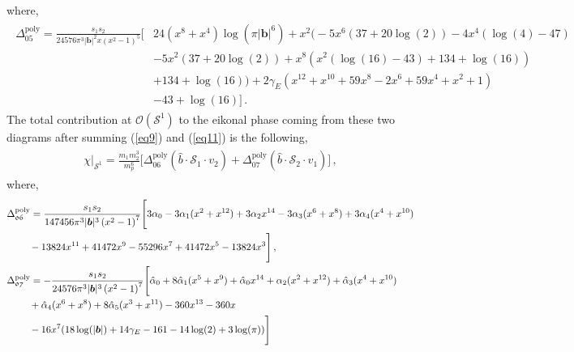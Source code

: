 where,
\begin{align}
    \begin{split}
\Delta_{\mathfrak{05}}^{\textrm{poly}}=\frac{s_1s_2}{24576 \pi ^3 |\boldsymbol{b}|^2 x \left(x^2-1\right)^5}\Bigg[&24 \left(x^8+x^4\right) \log \left(\pi  |\boldsymbol{b}|^6\right)+x^2 \Big(-5 x^6 (37+20 \log (2))-4 x^4 (\log (4)-47)\\ &-5 x^2 (37+20 \log (2))+x^8 \left(x^2 (\log (16)-43)+134+\log (16)\right)\\ &+134+\log (16)\Big)+2 \gamma_{E}  \left(x^{12}+x^{10}+59 x^8-2 x^6+59 x^4+x^2+1\right)\\ &-43+\log (16)\Bigg]\,.
        \end{split}
\end{align}
The total contribution at $\mathcal{O}(\mathcal{S}^1)$ to the eikonal phase coming from these two diagrams after summing (\ref{eq9}) and (\ref{eq11}) is the following,
\begin{align}
    \begin{split}  \label{eqt5}
     \chi\Big|_{\mathcal{S}^1}=\frac{m_1m_2^3}{m_p^6}\Bigg[\Delta_{\mathfrak{06}}^{\textrm{poly}}(\hat{b}\cdot \mathcal{S}_1\cdot v_2)+\Delta_{\mathfrak{07}}^{\textrm{poly}}(\hat{b}\cdot \mathcal{S}_2\cdot v_1)\Bigg]\,,
     \end{split}
\end{align}
where, 
\begin{align}
    \begin{split}   &\Delta_{\mathfrak{06}}^{\textrm{poly}}=\frac{s_1s_2}{147456 \pi ^3 |\boldsymbol{b}|^3  \left(x^2-1\right)^7}\Bigg[3\alpha_0-3\alpha_1(x^2+x^{12})+3\alpha_2x^{14}-3\alpha_3(x^6+x^{8})+3\alpha_4(x^4+x^{10})\\&\hspace{0.8cm}-13824 x^{11}+41472 x^9-55296 x^7+41472 x^5-13824 x^3\Bigg]\,,\\
& \Delta_{\mathfrak{07}}^{\textrm{poly}}=-\frac{s_1 s_2}{24576 \pi ^3 |\boldsymbol{b}|^3 \left(x^2-1\right)^7 }\Bigg[\hat{\alpha}_0+8\hat{\alpha}_1(x^5+x^{9})+\hat{\alpha}_0x^{14}+\alpha_2(x^2+x^{12})+\hat{\alpha}_3(x^4+x^{10})\\&\hspace{0.8cm}+\hat{\alpha}_4(x^6+x^{8})+8\hat{\alpha}_5(x^3+x^{11})-360 x^{13}-360 x\\&\hspace{0.8cm}-16 x^7 (18 \log (|\boldsymbol{b}|)+14 \gamma_E -161-14 \log (2)+3 \log (\pi ))\Bigg]
\end{split}
\end{align}
